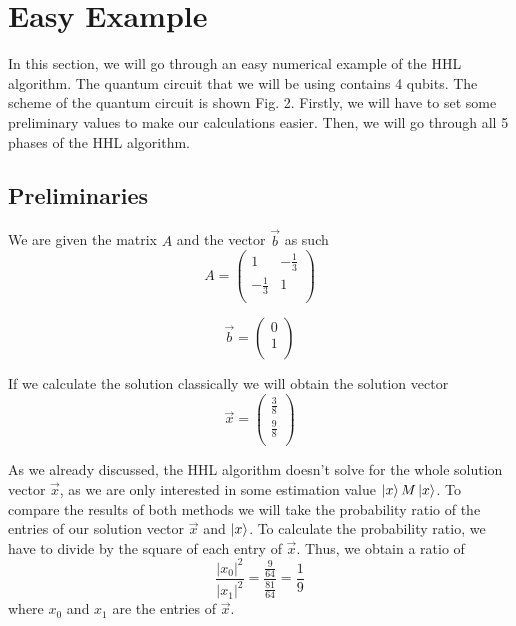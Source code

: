 \section{Easy Example}
In this section, we will go through an easy numerical example of the HHL algorithm.
The quantum circuit that we will be using contains 4 qubits.
The scheme of the quantum circuit is shown Fig. 2.
Firstly, we will have to set some preliminary values to make our calculations easier. 
Then, we will go through all 5 phases of the HHL algorithm. 

\subsection{Preliminaries}
We are given the matrix $A$ and the vector $\vec{b}$ as such
\begin{equation}
   A = \begin{pmatrix} 1 & -\frac{1}{3}\\ -\frac{1}{3} & 1\\ \end{pmatrix}
\end{equation}

\begin{equation}
    \vec{b} = \begin{pmatrix} 0 \\ 1\\ \end{pmatrix}
\end{equation}

If we calculate the solution classically we will obtain the solution vector 
\begin{equation}
\vec{x} = \begin{pmatrix} \frac{3}{8}\\ \frac{9}{8}\\ \end{pmatrix}
\end{equation}

As we already discussed, the HHL algorithm doesn't solve for the whole solution vector $\vec{x}$, as we are only interested in some estimation value $\ket x M \ket x$.
To compare the results of both methods we will take the probability ratio of the entries of our solution vector $\vec x$ and $\ket x$.
To calculate the probability ratio, we have to divide by the square of each entry of $\vec{x}$.
Thus, we obtain a ratio of
\begin{equation}
    \frac{ |x_0|^2}{ |x_1|^2}= \frac{\frac{9}{64}}{\frac{81}{64}} = \frac{1}{9}
\end{equation}
where $x_0$ and $x_1$ are the entries of $\vec x$.

